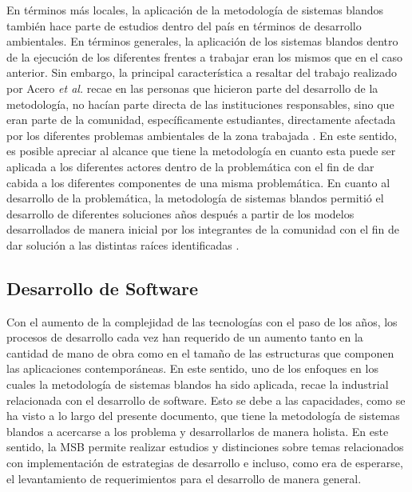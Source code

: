 \documentclass[10pt,letterpaper,twoside,twocolumn]{article}   %
\begin{document}
En términos más locales, la aplicación de la metodología de sistemas blandos también hace parte de estudios dentro del país en términos de desarrollo ambientales. En términos generales, la aplicación de los sistemas blandos dentro de la ejecución de los diferentes frentes a trabajar eran los mismos que en el caso anterior. Sin embargo, la principal característica a resaltar del trabajo realizado por Acero \textit{et al.} recae en las personas que hicieron parte del desarrollo de la metodología, no hacían parte directa de las instituciones responsables, sino que eran parte de la comunidad, específicamente estudiantes, directamente afectada por los diferentes problemas ambientales de la zona trabajada \cite{Acero[2]}. En este sentido, es posible apreciar al alcance que tiene la metodología en cuanto esta puede ser aplicada a los diferentes actores dentro de la problemática con el fin de dar cabida a los diferentes componentes de una misma problemática. En cuanto al desarrollo de la problemática, la metodología de sistemas blandos permitió el desarrollo de diferentes soluciones años después a partir de los modelos desarrollados de manera inicial por los integrantes de la comunidad con el fin de dar solución a las distintas raíces identificadas \cite{Acero[1]}.

\subsection{Desarrollo de Software}
Con el aumento de la complejidad de las tecnologías con el paso de los años, los procesos de desarrollo cada vez han requerido de un aumento tanto en la cantidad de mano de obra como en el tamaño de las estructuras que componen las aplicaciones contemporáneas. En este sentido, uno de los enfoques en los cuales la metodología de sistemas blandos ha sido aplicada, recae la industrial relacionada con el desarrollo de software. Esto se debe a las capacidades, como se ha visto a lo largo del presente documento, que tiene la metodología de sistemas blandos a acercarse a los problema y desarrollarlos de manera holista. En este sentido, la MSB permite realizar estudios y distinciones sobre temas relacionados con implementación de estrategias de desarrollo e incluso, como era de esperarse, el levantamiento de requerimientos para el desarrollo de manera general.
\end{document}
